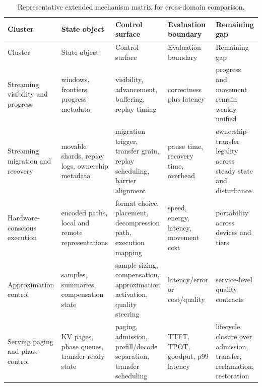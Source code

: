 \begin{longtable}{>{\raggedright\arraybackslash}p{}>{\raggedright\arraybackslash}p{}>{\raggedright\arraybackslash}p{}>{\raggedright\arraybackslash}p{}>{\raggedright\arraybackslash}p{}}
\caption{Representative extended mechanism matrix for cross-domain comparison.}\\
\toprule
Cluster & State object & Control surface & Evaluation boundary & Remaining gap \\
\midrule
\endfirsthead
\toprule
Cluster & State object & Control surface & Evaluation boundary & Remaining gap \\
\midrule
\endhead
Streaming visibility and progress~\cite{akidau2013millwheel,murray2013naiad,akidau2015dataflow} & windows, frontiers, progress metadata & visibility, advancement, buffering, replay timing & correctness plus latency & progress and movement remain weakly unified \\

Streaming migration and recovery~\cite{carbone2015asynchronous,nasir2019megaphone,zhao2024recovery,mao2025spacker} & movable shards, replay logs, ownership metadata & migration trigger, transfer grain, replay scheduling, barrier alignment & pause time, recovery time, overhead & ownership-transfer legality across steady state and disturbance \\

Hardware-conscious execution~\cite{zhang2020finestream,zeng2024cstream,zhang2023compressstreamdb} & encoded paths, local and remote representations & format choice, placement, decompression path, execution mapping & speed, energy, latency, movement cost & portability across devices and tiers \\

Approximation control~\cite{agarwal2013blinkdb,hu2018streamapprox,zeng2024pecj,zeng2024libamm} & samples, summaries, compensation state & sample sizing, compensation, approximation activation, quality steering & latency/error or cost/quality & service-level quality contracts \\

Serving paging and phase control~\cite{kwon2023pagedattention,agrawal2024sarathi,zhong2024distserve,patel2024splitwise} & KV pages, phase queues, transfer-ready state & paging, admission, prefill/decode separation, transfer scheduling & TTFT, TPOT, goodput, p99 latency & lifecycle closure over admission, transfer, reclamation, restoration \\


\end{longtable}
